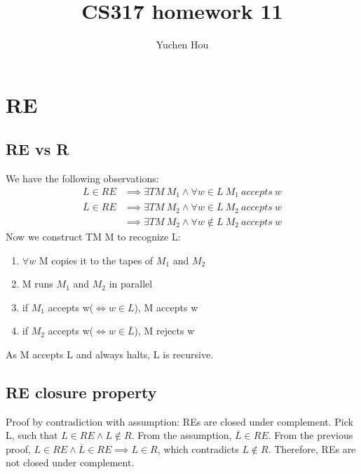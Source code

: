 \documentclass{article}
\begin{document}
\lstset{language=Java}
\title{CS317 homework 11}
\author{Yuchen Hou}
\maketitle

\section{RE}
\subsection{RE vs R}
We have the following observations:
\begin{align*}
L \in RE &\implies \exists TM \ M_1 \land \forall w \in L \ M_1 \ accepts \ w\\
\overline{L} \in RE &\implies \exists TM \ M_2 \land \forall w \in \overline{L}
\ M_2 \ accepts \ w\\
&\implies \exists TM \ M_2 \land \forall w \notin L \ M_2 \ accepts \ w
\end{align*}
Now we construct TM M to recognize L:
\begin{enumerate}
  \item $\forall w$ M copies it to the tapes of $M_1$ and $M_2$
  \item M runs $M_1$ and $M_2$ in parallel
  \item if $M_1 $ accepts w($\iff w \in L$), M accepts w
  \item if $M_2$ accepts w($\iff w \in \overline{L}$), M rejects w
\end{enumerate}
As M accepts L and always halts, L is recursive.
\subsection{RE closure property}
Proof by contradiction with assumption: REs are closed under complement. Pick
L, such that $L \in RE \land L\notin R$. From the assumption, $\overline{L} \in
RE$. From the previous proof, $L \in RE \land \overline{L} \in RE \implies L
\in R$, which contradicts $L\notin R$. Therefore, REs are not closed under
complement.
\end{document}
